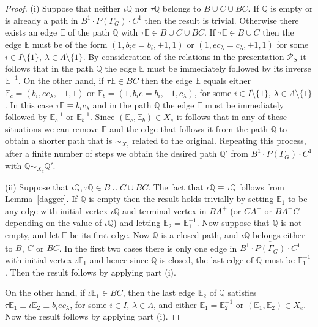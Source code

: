 \documentclass[11pt]{amsart}
\theoremstyle{plain}
\begin{document}
\begin{proof}

(i) Suppose that neither $\iota {\mathbb{Q}}$ nor $\tau {\mathbb{Q}}$ belongs to $B \cup C \cup BC$. 
If ${\mathbb{Q}}$ is empty or is already a path in $B^1 \cdot P(\Gamma_G) \cdot C^1$ then the result is trivial. Otherwise there exists an edge ${\mathbb{E}}$ of the path ${\mathbb{Q}}$ with $\tau {\mathbb{E}} \in B \cup C \cup BC$. If $\tau {\mathbb{E}} \in B \cup C$ then the edge ${\mathbb{E}}$ must be of the form $(1, b_i e = b_i, +1, 1)$ or $(1, ec_{\lambda} = c_{\lambda}, +1, 1)$ for some $i \in I \setminus \{ 1 \}$, $\lambda \in \Lambda \setminus \{ 1 \}$. By consideration of the relations in the presentation $\mathcal{P}_S$ it follows that in the path ${\mathbb{Q}}$ the edge ${\mathbb{E}}$ must be immediately followed by its inverse ${\mathbb{E}}^{-1}$. On the other hand, if $\tau {\mathbb{E}} \in BC$ then the edge ${\mathbb{E}}$ equals either ${\mathbb{E}}_c = (b_i, ec_{\lambda}, +1, 1)$ or ${\mathbb{E}}_b = (1, b_i e = b_i, +1, c_{\lambda})$, for some $i \in I \setminus \{ 1 \}$, $\lambda \in \Lambda \setminus \{ 1 \}$. In this case $\tau {\mathbb{E}} \equiv b_i c_{\lambda}$ and in the path ${\mathbb{Q}}$ the edge ${\mathbb{E}}$ must be immediately followed by ${\mathbb{E}}_c^{-1}$ or ${\mathbb{E}}_b^{-1}$. Since $({\mathbb{E}}_c, {\mathbb{E}}_b) \in X_e$ it follows that 
in any of these situations we can remove ${\mathbb{E}}$ and the edge that follows it from the path ${\mathbb{Q}}$ to obtain a shorter path that is $\sim_{X_e}$ related to the original. Repeating this process, after a finite number of steps we obtain the desired path ${\mathbb{Q}}'$ from $B^1 \cdot P(\Gamma_G) \cdot C^1$ with ${\mathbb{Q}} \sim_{X_e} {\mathbb{Q}}'$. 

(ii) Suppose that $\iota {\mathbb{Q}}, \tau {\mathbb{Q}} \in B \cup C \cup BC$. The fact that $\iota {\mathbb{Q}} \equiv \tau {\mathbb{Q}}$ follows from Lemma~\ref{dagger}. If ${\mathbb{Q}}$ is empty then the result holds trivially by setting ${\mathbb{E}}_1$ to be any edge with initial vertex $\iota {\mathbb{Q}}$ and terminal vertex in $BA^+$ (or $CA^+$ or $B A^+ C$ depending on the value of $\iota {\mathbb{Q}}$) and letting ${\mathbb{E}}_2 = {\mathbb{E}}_1^{-1}$. Now suppose that ${\mathbb{Q}}$ is not empty, and let ${\mathbb{E}}$ be its first edge. Now ${\mathbb{Q}}$ is a closed path, and $\iota {\mathbb{Q}}$ belongs either to $B$, $C$ or $BC$. In the first two cases there is only one edge in $\overline{B^1 \cdot P(\Gamma_G) \cdot C^1}$ with initial vertex $\iota {\mathbb{E}}_1$ and hence since ${\mathbb{Q}}$ is closed, the last edge of ${\mathbb{Q}}$ must be ${\mathbb{E}}_1^{-1}$. Then the result follows by applying part (i). 

On the other hand, if $\iota {\mathbb{E}}_1 \in BC$, then the last edge ${\mathbb{E}}_2$ of ${\mathbb{Q}}$ satisfies $\tau {\mathbb{E}}_1 \equiv \iota {\mathbb{E}}_2 \equiv b_i e c_{\lambda}$, for some $i \in I$, $\lambda \in \Lambda$, and either ${\mathbb{E}}_1 = {\mathbb{E}}_2^{-1}$ or $({\mathbb{E}}_1, {\mathbb{E}}_2) \in X_e$. Now the result follows by applying part (i).  \end{proof}
\end{document}
